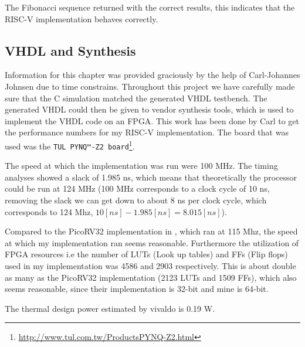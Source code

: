         The Fibonacci sequence returned with the correct results, this indicates that the RISC-V implementation behaves correctly.
        
    \subsection{VHDL and Synthesis}
        Information for this chapter was provided graciously by the help of Carl-Johannes Johnsen due to time constrains.
        Throughout this project we have carefully made sure that the C simulation matched the generated VHDL testbench. The generated VHDL could then be given to vendor synthesis tools, which is used to implement the VHDL code on an FPGA.
        This work has been done by Carl to get the performance numbers for my RISC-V implementation. The board that was used was the \texttt{TUL PYNQ™-Z2 board}\footnote{\url{http://www.tul.com.tw/ProductsPYNQ-Z2.html}}. 
        
        The speed at which the implementation was run were 100 MHz. The timing analyses showed a slack of 1.985 ns, which means that theoretically the processor could be run at 124 MHz (100 MHz corresponds to a clock cycle of 10 ns, removing the slack we can get down to about 8 ns per clock cycle, which corresponds to 124 Mhz, $10[ns]-1.985[ns]=8.015[ns]$). 
        
        Compared to the PicoRV32 implementation in \cite{8760205}, which ran at 115 Mhz, the speed at which my implementation ran seems reasonable. Furthermore the utilization of FPGA resources i.e  the number of LUTs (Look up tables) and FFs (Flip flops) used in my implementation was 4586 and 2903 respectively. This is about double as many as the PicoRV32 implementation (2123 LUTs and 1509 FFs), which also seems reasonable, since their implementation is 32-bit and mine is 64-bit.
        
        The thermal design power estimated by vivaldo is 0.19 W.
        
        
        
        
        
    